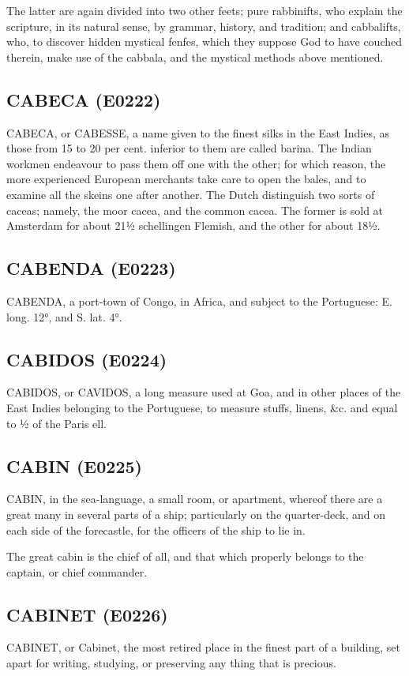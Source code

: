 \documentclass{article}
\begin{document}
The latter are again divided into two other feets; pure rabbinifts, who explain the scripture, in its natural sense, by grammar, history, and tradition; and cabbalifts, who, to discover hidden mystical fenfes, which they suppose God to have couched therein, make use of the cabbala, and the mystical methods above mentioned.

\subsection*{CABECA (E0222)}
CABECA, or CABESSE, a name given to the finest silks in the East Indies, as those from 15 to 20 per cent. inferior to them are called barina. The Indian workmen endeavour to pass them off one with the other; for which reason, the more experienced European merchants take care to open the bales, and to examine all the skeins one after another. The Dutch distinguish two sorts of caceas; namely, the moor cacea, and the common cacea. The former is sold at Amsterdam for about 21½ schellingen Flemish, and the other for about 18½.

\subsection*{CABENDA (E0223)}
CABENDA, a port-town of Congo, in Africa, and subject to the Portuguese: E. long. 12°, and S. lat. 4°.

\subsection*{CABIDOS (E0224)}
CABIDOS, or CAVIDOS, a long measure used at Goa, and in other places of the East Indies belonging to the Portuguese, to measure stuffs, linens, \&c. and equal to ½ of the Paris ell.

\subsection*{CABIN (E0225)}
CABIN, in the sea-language, a small room, or apartment, whereof there are a great many in several parts of a ship; particularly on the quarter-deck, and on each side of the forecastle, for the officers of the ship to lie in.

The great cabin is the chief of all, and that which properly belongs to the captain, or chief commander.

\subsection*{CABINET (E0226)}
CABINET, or Cabinet, the most retired place in the finest part of a building, set apart for writing, studying, or preserving any thing that is precious.
\end{document}
